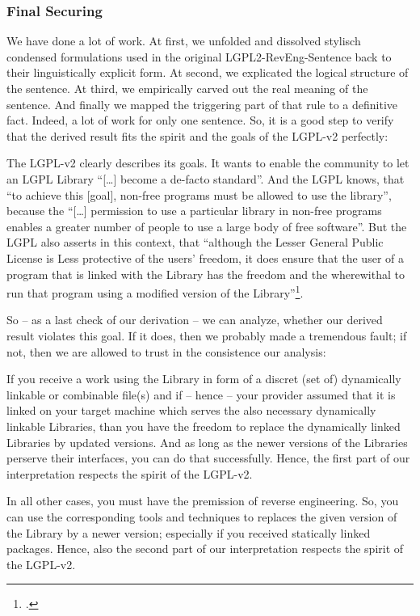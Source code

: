 \subsubsection{Final Securing}

We have done a lot of work. At first, we unfolded and dissolved stylisch
condensed formulations used in the original LGPL2-RevEng-Sentence back to their
linguistically explicit form. At second, we explicated the logical structure of
the sentence. At third, we empirically carved out the real meaning of the
sentence. And finally we mapped the triggering part of that rule to a definitive
fact. Indeed, a lot of work for only one sentence. So, it is a good step to
verify that the derived result fits the spirit and the goals of the LGPL-v2
perfectly:

The LGPL-v2 clearly describes its goals. It wants to enable the community to let
an LGPL Library \enquote{[\ldots] become a de-facto standard}. And the LGPL
knows, that \enquote{to achieve this [goal], non-free programs must be allowed
to use the library}, because the \enquote{[\ldots] permission to use a particular
library in non-free programs enables a greater number of people to use a large
body of free software}. But the LGPL also asserts in this context, that
\enquote{although the Lesser General Public License is Less protective of the
users' freedom, it does ensure that the user of a program that is linked with
the Library has the freedom and the wherewithal to run that program using a
modified version of the Library}\footcite[cf.][\nopage wp., preamble, emphasis
KR.]{Lgpl21OsiLicense1999a}.

So -- as a last check of our derivation -- we can analyze, whether our derived
result violates this goal. If it does, then we probably made a tremendous fault;
if not, then we are allowed to trust in the consistence our analysis:

If you receive a work using the Library in form of a discret (set of)
dynamically linkable or combinable file(s) and if -- hence -- your provider
assumed that it is linked on your target machine which serves the also necessary
dynamically linkable Libraries, than you have the freedom to replace the
dynamically linked Libraries by updated versions. And as long as the newer
versions of the Libraries perserve their interfaces, you can do that
successfully. Hence, the first part of our interpretation respects the spirit
of the LGPL-v2.

In all other cases, you must have the premission of reverse engineering. So, you
can use the corresponding tools and techniques to replaces the given version of
the Library by a newer version; especially if you received statically linked
packages. Hence, also the second part of our interpretation respects the spirit
of the LGPL-v2.

